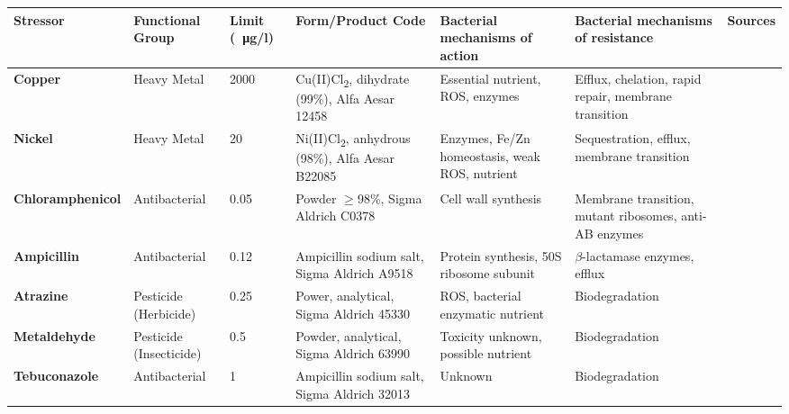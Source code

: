 \documentclass[final,1p,times]{elsarticle}
\begin{document}
\begin{landscape}
\begin{table}[ht]
\begin{threeparttable}
\small
\setlength{\tabcolsep}{4pt}
\setlength{\extrarowheight}{3pt}
\begin{tabular}{l M l M L L c}
\toprule
\textbf{Stressor} & \textbf{Functional Group} & \textbf{Limit (\SI{}{\ug}/l}) & \textbf{Form/Product Code} & \textbf{Bacterial mechanisms of action} & \textbf{Bacterial mechanisms of resistance} & \textbf{Sources} \\
\midrule
{}\textbf{Copper} & Heavy Metal & 2000 & Cu(II)Cl\textsubscript{2}, dihydrate (99\%), Alfa Aesar 12458 & Essential nutrient, ROS, enzymes & Efflux, chelation, rapid repair, membrane transition & \cite{Nayar2004EnvironmentalMesocosms,Valko2005MetalsStress,Dupont2011CopperApplications,ECHA2018REACHCopper} \\
\textbf{Nickel} & Heavy Metal & 20 & Ni(II)Cl\textsubscript{2}, anhydrous (98\%), Alfa Aesar B22085 & Enzymes, Fe/Zn homeostasis, weak ROS, nutrient & Sequestration, efflux, membrane transition & \cite{Nayar2004EnvironmentalMesocosms,Macomber2011,Nishimura1998ProtonCerevisiae,Zamble2015NickelBiology} \\
\textbf{Chloramphenicol} & Antibacterial & 0.05 & Powder $\geqslant$98\%, Sigma Aldrich C0378 & Cell wall synthesis & Membrane transition, mutant ribosomes, anti-AB enzymes & \cite{Shaw1979Primary31,Rebstock1949ChloramphenicolChloromycetin,Toku-E2018ChloramphenicolChloromycetin,Ruiz1999MechanismsFish} \\
\textbf{Ampicillin} & Antibacterial & 0.12 & Ampicillin sodium salt, Sigma Aldrich A9518 & Protein synthesis, 50S ribosome subunit & $\beta$-lactamase enzymes, efflux & \cite{Ruiz1999MechanismsFish,Costanzo2005EcosystemEnvironment} \\
\textbf{Atrazine} & Pesticide (Herbicide) & 0.25 & Power, analytical, Sigma Aldrich 45330 & ROS, bacterial enzymatic nutrient & Biodegradation & \cite{Shimabukuro1969AtrazineAction,Delorenzo2001TOXICITYREVIEW,Zhang2012OxidativeAtrazine} \\
\textbf{Metaldehyde} & Pesticide \break (Insecticide) & 0.5 & Powder, analytical, Sigma Aldrich 63990 & Toxicity unknown, possible nutrient & Biodegradation & \cite{Kay2014UsingProblem,Castle2017,Thomas2017IsolationSoils} \\
\textbf{Tebuconazole} & Antibacterial & 1 & Ampicillin sodium salt, Sigma Aldrich 32013 & Unknown & Biodegradation & \cite{Sehnem2010,Artigas2014ComparativeEcosystems} \\

\end{tabular}
\end{threeparttable}
\end{table}
\end{landscape}
\end{document}
